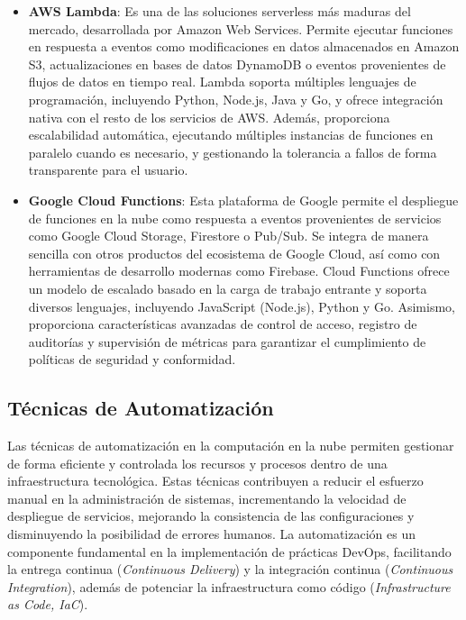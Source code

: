 {                \begin{itemize}
                    \item \textbf{AWS Lambda}: Es una de las soluciones serverless más maduras del mercado, desarrollada por Amazon Web Services. Permite ejecutar funciones en respuesta a eventos como modificaciones en datos almacenados en Amazon S3, actualizaciones en bases de datos DynamoDB o eventos provenientes de flujos de datos en tiempo real. Lambda soporta múltiples lenguajes de programación, incluyendo Python, Node.js, Java y Go, y ofrece integración nativa con el resto de los servicios de AWS. Además, proporciona escalabilidad automática, ejecutando múltiples instancias de funciones en paralelo cuando es necesario, y gestionando la tolerancia a fallos de forma transparente para el usuario.                   
                    \item \textbf{Google Cloud Functions}: Esta plataforma de Google permite el despliegue de funciones en la nube como respuesta a eventos provenientes de servicios como Google Cloud Storage, Firestore o Pub/Sub. Se integra de manera sencilla con otros productos del ecosistema de Google Cloud, así como con herramientas de desarrollo modernas como Firebase. Cloud Functions ofrece un modelo de escalado basado en la carga de trabajo entrante y soporta diversos lenguajes, incluyendo JavaScript (Node.js), Python y Go. Asimismo, proporciona características avanzadas de control de acceso, registro de auditorías y supervisión de métricas para garantizar el cumplimiento de políticas de seguridad y conformidad.
                \end{itemize}
                        
        \subsection{Técnicas de Automatización}
            Las técnicas de automatización en la computación en la nube permiten gestionar de forma eficiente y controlada los recursos y procesos dentro de una infraestructura tecnológica. Estas técnicas contribuyen a reducir el esfuerzo manual en la administración de sistemas, incrementando la velocidad de despliegue de servicios, mejorando la consistencia de las configuraciones y disminuyendo la posibilidad de errores humanos. La automatización es un componente fundamental en la implementación de prácticas DevOps, facilitando la entrega continua (\textit{Continuous Delivery}) y la integración continua (\textit{Continuous Integration}), además de potenciar la infraestructura como código (\textit{Infrastructure as Code, IaC}).
            
}
